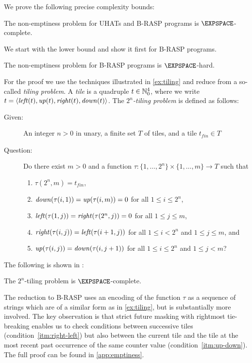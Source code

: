 We prove the following precise complexity bounds:
\begin{theorem}\label{thm:UHAT-emptiness}
The non-emptiness problem for UHATs and B-RASP programs is $\EXPSPACE$-complete.
\end{theorem}

We start with the lower bound and show it first for B-RASP programs.
\begin{proposition}\label{prop:hardness}
The non-emptiness problem for B-RASP programs is $\EXPSPACE$-hard.
\end{proposition}
For the proof we use the techniques illustrated in \cref{ex:tiling} and reduce from a so-called \emph{tiling problem}.
A \emph{tile} is a quadruple $t \in \mathbb{N}_0^4$, where we write $t = \langle\mathit{left}(t),\mathit{up}(t),\mathit{right}(t),\mathit{down}(t)\rangle$.
The \emph{$2^n$-tiling problem} is defined as follows:

\begin{description}
\item[Given:] An integer $n > 0$ in unary, a finite set $T$ of tiles, and a tile $t_\mathit{fin} \in T$
\item[Question:] Do there exist $m > 0$ and a function $\tau \colon \{1,\dots,2^n\} \times \{1,\dots,m\} \to T$ such that
\begin{enumerate}
\item $\tau(2^n,m) = t_\mathit{fin}$, \label{itm:t-fin}
\item $\mathit{down}(\tau(i,1)) = \mathit{up}(\tau(i,m)) = 0$ for all $1 \le i \le 2^n$, \label{itm:bot-top}
\item $\mathit{left}(\tau(1,j)) = \mathit{right}(\tau(2^n,j)) = 0$ for all $1 \le j \le m$, \label{itm:first-last}
\item $\mathit{right}(\tau(i,j)) = \mathit{left}(\tau(i+1,j))$ for all $1 \le i < 2^n$ and $1 \le j \le m$, and \label{itm:right-left}
\item $\mathit{up}(\tau(i,j)) = \mathit{down}(\tau(i,j+1))$ for all $1 \le i \le 2^n$ and $1 \le j < m$? \label{itm:up-down}
\end{enumerate}
\end{description}
The following is shown in \citep{Schwarzentruber19}:
\begin{proposition}\label{prop:tiling}
The $2^n$-tiling problem is $\EXPSPACE$-complete.
\end{proposition}

The reduction to B-RASP uses an encoding of the function $\tau$ as a sequence of strings 
which are of a similar form as in \cref{ex:tiling}, but is substantially more
involved.
The key observation is that strict future masking with rightmost tie-breaking 
enables us to check conditions between successive tiles (condition~\ref{itm:right-left}) 
but also between the current tile and the tile at the most recent past occurrence of the same counter value
(condition~\ref{itm:up-down}).
The full proof can be found in \cref{app:emptiness}.

